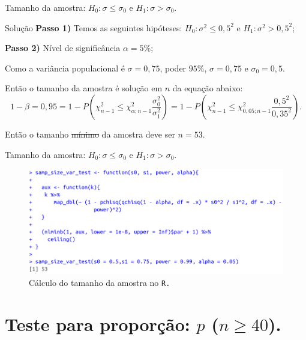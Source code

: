 \documentclass[8pt]{beamer}
\begin{document}
\begin{frame}{Tamanho da amostra: $H_0: \sigma \leq \sigma_0$ e $H_1: \sigma > \sigma_0$.}
\begin{block}{Solução}
	\textbf{Passo 1)} Temos as seguintes hipóteses: $H_0: \sigma^2 \leq 0,5^2$ e $H_1: \sigma^2 > 0,5^2$;
	
	\textbf{Passo 2)} Nível de significância $\alpha = 5\%$;
	
	Como a variância populacional é $\sigma=0,75$, poder $95\%$, $\sigma=0,75$ e $\sigma_0 = 0,5$.
	
	Então o tamanho da amostra é solução em $n$ da equação abaixo:
	$$1-\beta=0,95 =1- P \left( \chi_{n-1}^2 \leq \chi_{\alpha;n-1}^2 \frac{\sigma_0^2}{\sigma_1^2} \right) =1- P \left( \chi_{n-1}^2 \leq \chi_{0,05;n-1}^2 \frac{0,5^2}{0,35^2} \right).$$
	
	Então o tamanho \sout{mínimo} da amostra deve ser $n=53$.
	
\end{block}
\end{frame}

\begin{frame}{Tamanho da amostra: $H_0: \sigma \leq \sigma_0$ e $H_1: \sigma > \sigma_0$.}

\begin{figure}[htbp]
	\centering
	\includegraphics[width=1\linewidth]{figures/var-test-power-unilateral-h0-lower-R.png}
	\caption{Cálculo do tamanho da amostra no \texttt{R.}}
\end{figure}

\end{frame}

\section{Teste para proporção: $p$ ($n \geq 40$).}
\end{document}
